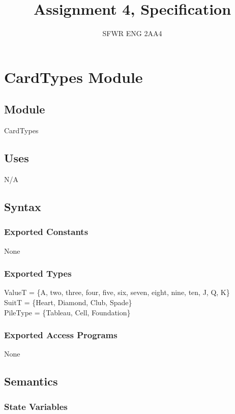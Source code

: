 \documentclass[12pt]{article}
\title{Assignment 4, Specification}
\author{SFWR ENG 2AA4}
\begin{document}
\maketitle


\newpage

\section* {CardTypes Module}

\subsection*{Module}

CardTypes

\subsection* {Uses}

N/A

\subsection* {Syntax}

\subsubsection* {Exported Constants}

None

\subsubsection* {Exported Types}

ValueT = \{A, two, three, four, five, six, seven, eight, nine, ten, J, Q, K\}\\ 
SuitT = \{Heart, Diamond, Club, Spade\}\\
PileType = \{Tableau, Cell, Foundation\}

\subsubsection* {Exported Access Programs}

None

\subsection* {Semantics}

\subsubsection* {State Variables}
\end{document}

